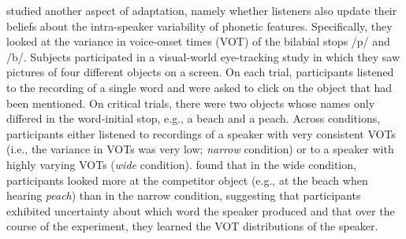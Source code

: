  \textcite{Clayards2008} studied another aspect of adaptation, namely whether listeners also update their beliefs about the intra-speaker variability
 of phonetic features. Specifically, they looked at the variance in voice-onset times (VOT) of the bilabial stops /p/ and /b/. Subjects participated in a visual-world
 eye-tracking study in which they saw pictures of four different objects on a screen. On each trial, participants listened to the recording of a single word
 and were asked to click on the object that had been mentioned. On critical trials, there were two objects whose names only differed in the word-initial stop, e.g.,
 a beach and a peach. Across conditions, participants either listened to recordings of a speaker with very consistent VOTs (i.e., the variance in VOTs was very low; \textit{narrow} condition) or
 to a speaker with highly varying VOTs (\textit{wide} condition). \textcite{Clayards2008} found that in the wide condition, participants looked more at the competitor object 
 (e.g., at the beach when hearing \textit{peach}) than in the narrow condition, suggesting that participants exhibited uncertainty about which word the speaker produced
and that over the course of the experiment, they learned the VOT distributions of the speaker.


